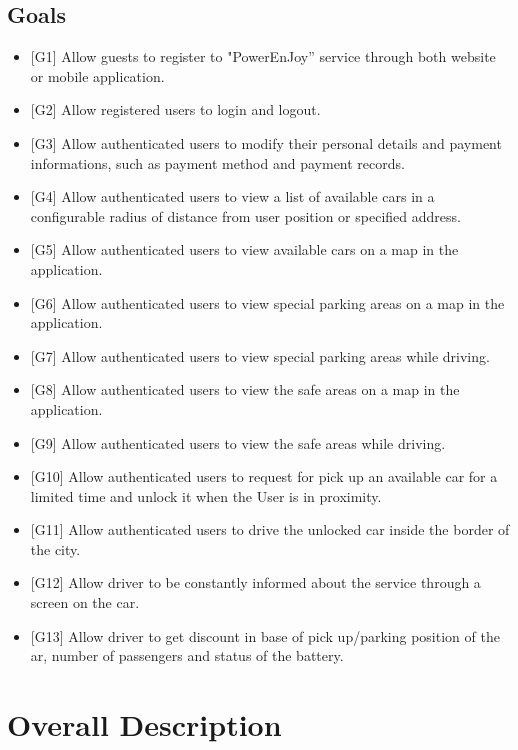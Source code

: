 \documentclass[english]{article}
\begin{document}
\subsection{Goals}
\begin{itemize}
	\item {[}G1{]} Allow guests to register to "PowerEnJoy'' service through
	both website or mobile application.
	\item {[}G2{]} Allow registered users to login and logout.
	\item {[}G3{]} Allow authenticated users to modify their personal details
	and payment informations, such as payment method and payment records.
	\item {[}G4{]} Allow authenticated users to view a list of available cars
	in a configurable radius of distance from user position or specified
	address.
	

	\item {[}G5{]} Allow authenticated users to view available cars on a map in the application.
	\item {[}G6{]} Allow authenticated users to view special parking areas on a map in the application.
	\item {[}G7{]} Allow authenticated users to view special parking areas while driving.	
	\item {[}G8{]} Allow authenticated users to view the safe areas on a map in the application.
	\item {[}G9{]} Allow authenticated users to view the safe areas while driving.
		
	\item {[}G10{]} Allow authenticated users to request for pick up an available
	car for a limited time and unlock it when the User is in proximity.
	\item {[}G11{]} Allow authenticated users to drive the unlocked car inside
	the border of the city.
	\item {[}G12{]} Allow driver to be constantly informed about the service through a screen on the car.
	\item {[}G13{]} Allow driver to get discount in base of pick up/parking
	position of the ar, number of passengers and status of the battery.
\end{itemize}

\pagebreak{}



\section{Overall Description}
\end{document}
